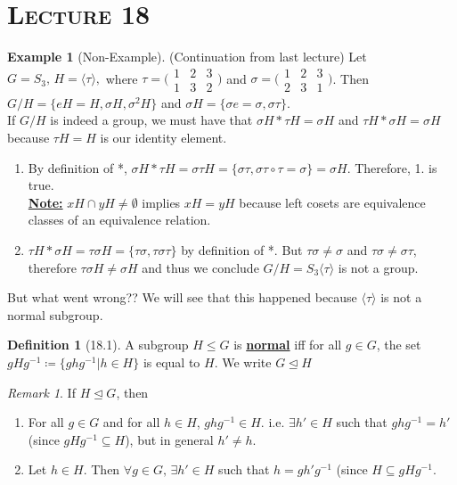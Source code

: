 \documentclass{article}
\newcommand{\es}{\emptyset}
\newcommand{\inter}{\cap}
\newcommand{\coleq}{\coloneqq}
\newcommand{\inverse}[1]{#1^{-1}}
\newcommand{\define}[1]{\textbf{\underline{#1}}}
\renewcommand{\Subset}{\subseteq}
\theoremstyle{definition}
\newtheorem*{defn}{Definition}
\newtheorem*{ex}{Example}
\theoremstyle{remark}
\newtheorem*{rmk}{Remark}
\newcommand{\gen}[1]{\langle#1\rangle}
\newcommand{\normal}{\unlhd}
\begin{document}
    \noindent\section*{\textbf{\textsc{Lecture 18}}}{
        \begin{ex}[Non-Example]
            (Continuation from last lecture) Let $G=S_3, \, H= \gen{\tau},$ where $\tau=\big(\begin{smallmatrix} 1&2&3\\ 1&3&2 \end{smallmatrix}\big)$ and $\sigma= \big(\begin{smallmatrix} 1&2&3\\ 2&3&1 \end{smallmatrix}\big)$. Then $G/H=\{eH=H,\sigma H, \sigma^2H\}$ and $\sigma H=\{\sigma e=\sigma, \sigma\tau\}$.\\
            If $G/H$ is indeed a group, we must have that $\sigma H * \tau H=\sigma H$ and $\tau H * \sigma H=\sigma H$ because $\tau H=H$ is our identity element.
            \begin{enumerate}
                \item By definition of *, $\sigma H * \tau H=\sigma \tau H= \{\sigma\tau, \sigma\tau \circ \tau = \sigma\}=\sigma H$. Therefore, 1. is true.\\
                \define{Note:} $xH\inter yH\neq \es$ implies $xH=yH$ because left cosets are equivalence classes of an equivalence relation.
                \item $\tau H * \sigma H=\tau\sigma H=\{\tau\sigma, \tau\sigma\tau\}$ by definition of *. But $\tau\sigma \neq \sigma$ and $\tau\sigma \neq \sigma\tau$, therefore $\tau\sigma H \neq \sigma H$ and thus we conclude $G/H=S_3\gen{\tau}$ is not a group.
            \end{enumerate}
        \end{ex}
        
        But what went wrong?? We will see that this happened because $\gen{\tau}$ is not a normal subgroup.
        
        \begin{defn}[18.1]
            A subgroup $H\leq G$ is \define{normal} iff for all $g \in G$, the set $gH\inverse{g}\coleq\{gh\inverse{g}|h \in H\}$ is equal to $H$. We write $G \normal H$
        \end{defn}
        
        \begin{rmk}
            If $H \normal G$, then
            \begin{enumerate}
                \item For all $g \in G$ and for all $h \in H$, $gh\inverse{g}\in H$. i.e. $\exists h'\in H$ such that $gh\inverse{g}=h'$ (since $gH\inverse{g}\Subset H$), but in general $h'\neq h$.
                \item Let $h \in H$. Then $\forall g \in G, \, \exists h' \in H$ such that $h=gh'\inverse{g}$ (since $H \Subset gH\inverse{g}$.
            \end{enumerate}
        \end{rmk}
        
}
\end{document}
